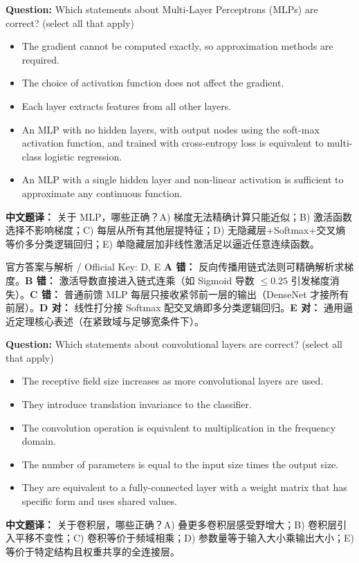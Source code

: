 \textbf{Question:} Which statements about Multi-Layer Perceptrons (MLPs) are correct? (select all that apply)
\begin{itemize}
\item[A)] The gradient cannot be computed exactly, so approximation methods are required.
\item[B)] The choice of activation function does not affect the gradient.
\item[C)] Each layer extracts features from all other layers.
\item[D)] An MLP with no hidden layers, with output nodes using the soft-max activation function, and trained with cross-entropy loss is equivalent to multi-class logistic regression.
\item[E)] An MLP with a single hidden layer and non-linear activation is sufficient to approximate any continuous function.
\end{itemize}
\textbf{中文题译：} 关于 MLP，哪些正确？A) 梯度无法精确计算只能近似；B) 激活函数选择不影响梯度；C) 每层从所有其他层提特征；D) 无隐藏层+Softmax+交叉熵等价多分类逻辑回归；E) 单隐藏层加非线性激活足以逼近任意连续函数。

\begin{StudySolution}{官方答案与解析 / Official Key: D, E}
\textbf{A 错：} 反向传播用链式法则可精确解析求梯度。\textbf{B 错：} 激活导数直接进入链式连乘（如 Sigmoid 导数 $\le 0.25$ 引发梯度消失）。\textbf{C 错：} 普通前馈 MLP 每层只接收紧邻前一层的输出（DenseNet 才接所有前层）。\textbf{D 对：} 线性打分接 Softmax 配交叉熵即多分类逻辑回归。\textbf{E 对：} 通用逼近定理核心表述（在紧致域与足够宽条件下）。
\end{StudySolution}

\textbf{Question:} Which statements about convolutional layers are correct? (select all that apply)
\begin{itemize}
\item[A)] The receptive field size increases as more convolutional layers are used.
\item[B)] They introduce translation invariance to the classifier.
\item[C)] The convolution operation is equivalent to multiplication in the frequency domain.
\item[D)] The number of parameters is equal to the input size times the output size.
\item[E)] They are equivalent to a fully-connected layer with a weight matrix that has specific form and uses shared values.
\end{itemize}
\textbf{中文题译：} 关于卷积层，哪些正确？A) 叠更多卷积层感受野增大；B) 卷积层引入平移不变性；C) 卷积等价于频域相乘；D) 参数量等于输入大小乘输出大小；E) 等价于特定结构且权重共享的全连接层。

